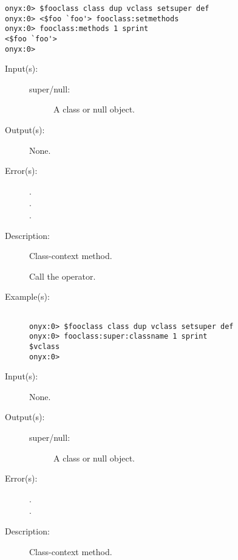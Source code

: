 \begin{description}
\begin{description}
\begin{verbatim}
onyx:0> $fooclass class dup vclass setsuper def
onyx:0> <$foo `foo'> fooclass:setmethods
onyx:0> fooclass:methods 1 sprint
<$foo `foo'>
onyx:0>
		\end{verbatim}
	\end{description}
\label{vclass:setsuper}
\item[{\onyxop{super/null}{setsuper}{--}}: ]
	\begin{description}\item[]
	\item[Input(s): ]
		\begin{description}\item[]
		\item[super/null: ]
			A class or null object.
		\end{description}
	\item[Output(s): ] None.
	\item[Error(s): ]
		\begin{description}\item[]
		\item[.]
		\item[.]
		\item[.]
		\end{description}
	\item[Description: ]
		Class-context method.

		Call the 
		operator.
	\item[Example(s): ]\begin{verbatim}

onyx:0> $fooclass class dup vclass setsuper def
onyx:0> fooclass:super:classname 1 sprint
$vclass
onyx:0>
		\end{verbatim}
	\end{description}
\label{vclass:super}
\item[{\onyxop{--}{super}{super/null}}: ]
	\begin{description}\item[]
	\item[Input(s): ] None.
	\item[Output(s): ]
		\begin{description}\item[]
		\item[super/null: ]
			A class or null object.
		\end{description}
	\item[Error(s): ]
		\begin{description}\item[]
		\item[.]
		\item[.]
		\end{description}
	\item[Description: ]
		Class-context method.


\end{description}
\end{description}
